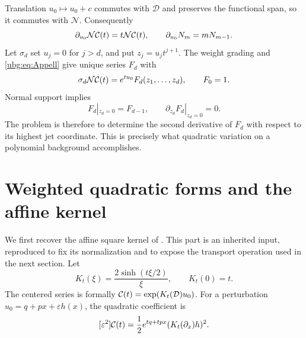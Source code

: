 \documentclass[11pt,letterpaper]{article}
\numberwithin{equation}{section}
\theoremstyle{definition}\newtheorem{definition}[theorem]{Definition}
\theoremstyle{remark}\newtheorem{remark}[theorem]{Remark}
\newcommand{\D}{\mathcal D}\newcommand{\NF}{\mathcal N}\newcommand{\HF}{\mathcal H}
\begin{document}
Translation $u_0\mapsto u_0+c$ commutes with $\D$ and preserves the
functional span, so it commutes with $\NF$. Consequently
\begin{equation}\label{ubg:eq:Appell}
 \partial_{u_0}\NF\CC(t)=t\NF\CC(t),\qquad
 \partial_{u_0}N_m=mN_{m-1}.
\end{equation}
Let $\sigma_d$ set $u_j=0$ for $j>d$, and put $z_j=u_jt^{j+1}$.
The weight grading and \eqref{ubg:eq:Appell} give unique series $F_d$ with
\begin{equation}\label{ubg:eq:Fd}
 \sigma_d\NF\CC(t)=e^{tu_0}F_d(z_1,\ldots,z_d),
 \qquad F_0=1.
\end{equation}
Normal support implies
\begin{equation}\label{ubg:eq:initial-Fd}
 F_d|_{z_d=0}=F_{d-1},\qquad
 \partial_{z_d}F_d|_{z_d=0}=0.
\end{equation}
The problem is therefore to determine the second derivative of $F_d$
with respect to its highest jet coordinate. This is precisely what
quadratic variation on a polynomial background accomplishes.

\section{Weighted quadratic forms and the affine kernel}
\label{ubg:sec:affine}

We first recover the affine square kernel of \cite{Affine}. This
part is an inherited input, reproduced to fix its normalization and
to expose the transport operation used in the next section.
Let
\begin{equation}\label{ubg:eq:Kt}
 K_t(\xi)=\frac{2\sinh(t\xi/2)}\xi,
 \qquad K_t(0)=t.
\end{equation}
The centered series is formally $\CC(t)=\exp(K_t(\D)u_0)$.
For a perturbation $u_0=q+px+\varepsilon h(x)$, the quadratic
coefficient is
\begin{equation}\label{ubg:eq:quadratic-affine}
 [\varepsilon^2]\mathcal C(t)=\frac12 e^{tq+tpx}(K_t(\partial_x)h)^2.
\end{equation}
\end{document}
